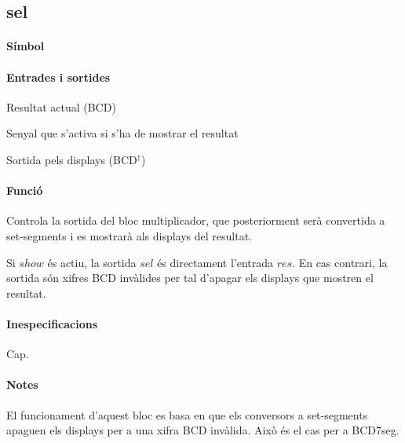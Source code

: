 \subsection{\label{sub:\projectname-sel} \textsf{sel}}

\paragraph{Símbol}

\begin{center}  \end{center}

\paragraph{Entrades i sortides}

\begin{where}
\item[\nodenamerange{res}{7}{0}] Resultat actual (BCD)
\item[\nodenamebit{show}] Senyal que s'activa si s'ha de mostrar el resultat
\item[\nodenamerange{sel}{7}{0}] Sortida pels displays (BCD$^\dagger$)
\end{where}

\paragraph{Funció}

Controla la sortida del bloc multiplicador, que posteriorment serà convertida a set-segments
i es mostrarà als displays del resultat.

Si $show$ és actiu, la sortida $sel$ és directament l'entrada $res$. En cas contrari,
la sortida són xifres BCD invàlides per tal d'apagar els displays que mostren
el resultat.

\paragraph{Inespecificacions}

Cap.

\paragraph{Notes}

El funcionament d'aquest bloc es basa en que els conversors a set-segments
apaguen els displays per a una xifra BCD invàlida. Això és el cas per a
\textsf{BCD7seg}.

